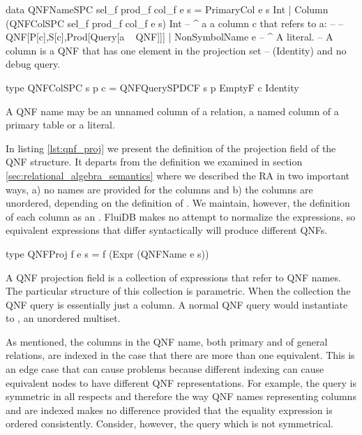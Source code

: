 \begin{code}
  \begin{haskellcode}
    data QNFNameSPC sel_f prod_f col_f e s =
      PrimaryCol e s Int
      | Column (QNFColSPC sel_f prod_f col_f e s) Int
      -- ^ a a column c that refers to a:
      --
      -- QNF[P[c],S[c],Prod[Query[a ~ QNF]]]
      | NonSymbolName e
      -- ^ A literal.
      -- A column is a QNF that has one element in the projection set
      -- (Identity) and no debug query.

    type QNFColSPC s p c = QNFQuerySPDCF s p EmptyF c Identity
  \end{haskellcode}
  \caption{\label{lst:qnf_name}A QNF name may be an unnamed column of
    a relation, a named column of a primary table or a literal.}
\end{code}

In listing \ref{lst:qnf_proj} we present the definition of the projection
field of the QNF structure. It departs from the definition we examined in
section \ref{sec:relational_algebra_semantics} where we described the RA in two
important ways, a) no names are provided for the columns and b) the columns are
unordered, depending on the definition of .
We maintain, however, the definition of each column as an .
FluiDB makes no attempt to normalize the expressions, so equivalent
expressions that differ syntactically will produce different QNFs.

\begin{code}
  \begin{haskellcode}
    type QNFProj f e s = f (Expr (QNFName e s))
  \end{haskellcode}
  \caption{\label{lst:qnf_proj}A QNF projection field is a collection of
    expressions that refer to QNF names. The particular structure of
    this collection is parametric. When the collection 
    the QNF query is essentially just a column. A normal QNF query
    would instantiate  to , an unordered
    multiset.}
\end{code}

As mentioned, the columns in the QNF name, both primary and of general
relations, are indexed in the case that there are more than one
equivalent. This is an edge case that can cause problems because
different indexing can cause equivalent nodes to have different
QNF representations. For example, the query  is symmetric in all respects and therefore the way
QNF names  representing columns  and  are indexed makes no difference
provided that the equality expression  is ordered consistently.
Consider, however, the query 
which is not symmetrical.

